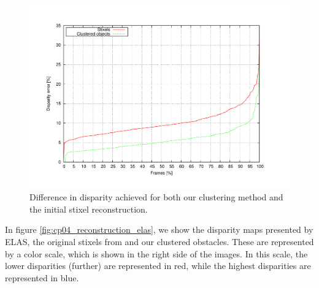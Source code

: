 \begin{figure}[h!]
\centering
\includegraphics[trim=50 40 80 60,clip]{disparity}
\caption{Difference in disparity achieved for both our clustering method and the initial stixel reconstruction.}\label{fig:cp04_disparity_comparison}
\end{figure}

In figure \ref{fig:cp04_reconstruction_elas}, we show the disparity maps presented by \ac{ELAS}, the original stixels from \cite{benenson2011stixels} and our clustered obstacles. These are represented by a color scale, which is shown in the right side of the images. In this scale, the lower disparities (further) are represented in red, while the highest disparities are represented in blue.

